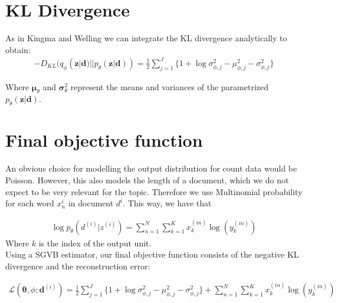 \documentclass{article}
\begin{document}
	
	\section{KL Divergence}
	
	
	As in Kingma and Welling we can integrate the KL divergence analytically to obtain: \\
	
	
	\begin{align}
	- D_{KL}(q_\phi (\mathbf{z}| \mathbf{d})||p_\theta (\mathbf{z}| \mathbf{d})) = \frac{1}{2}\sum\limits_{j=1}^{J}\{1+\log \sigma_{\phi ,j}^2 - \mu_{\phi,j}^2 - \sigma_{\phi ,j}^2\}
	\end{align}
	
	Where $\mathbf{\mu}_\theta$ and $\mathbf{\sigma}_\theta^2$ represent the means and variances of the parametrized $p_\theta(\mathbf{z}|\mathbf{d})$.
	
	\section{Final objective function}
	
	An obvious choice for modelling the output distribution for count data would be Poisson. However, this also models the length of a document, which we do not expect to be very relevant for the topic. Therefore we use Multinomial probability for each word $x_n^{i}$ in document $d^{i}$. This way, we have that
	
	
	\begin{align}
	\log p_{\theta}(d^{(i)}|z^{(i)}) = 
	\sum_{n=1}^N
	\sum_{k=1}^K x_k^{(in)} \log (y_k^{(in)})
	\end{align}
	Where $k$ is the index of the output unit.\\
	
	
	Using a SGVB estimator, our final objective function consists of the negative KL divergence and the reconstruction error:
	
	\begin{align}
	\mathcal{L}(\mathbf{\theta}, \phi; \mathbf{d}^{(i)}) = \frac{1}{2}\sum\limits_{j=1}^{J}\{1+\log \sigma_{\phi ,j}^2 - \mu_{\phi,j}^2 - \sigma_{\phi ,j}^2\} 
	+ \sum_{n=1}^N
	\sum_{k=1}^K x_k^{(in)} \log (y_k^{(in)})
	\end{align}
	
	
	
	

	
	
	
	
\end{document}
